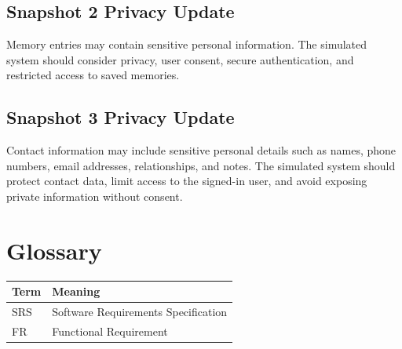 \documentclass{article}
\begin{document}
\subsection{Snapshot 2 Privacy Update}

Memory entries may contain sensitive personal information. The simulated system should consider privacy, user consent, secure authentication, and restricted access to saved memories.

\subsection{Snapshot 3 Privacy Update}

Contact information may include sensitive personal details such as names, phone numbers, email addresses, relationships, and notes. The simulated system should protect contact data, limit access to the signed-in user, and avoid exposing private information without consent.

\section{Glossary}
\begin{longtable}{|p{3cm}|p{10cm}|}
\hline
Term & Meaning \\ \hline
SRS & Software Requirements Specification \\ \hline
FR & Functional Requirement \\ \hline
\end{longtable}
\end{document}
